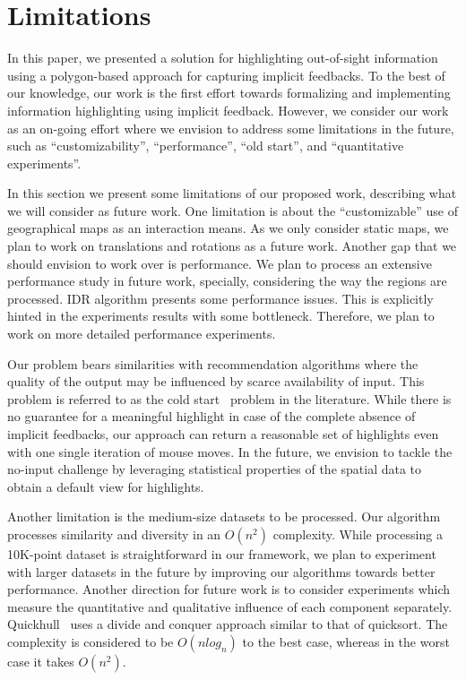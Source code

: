 \documentclass[sigconf,edbt]{acmart-edbt2019}
\begin{document}
\section{Limitations}
\label{sec:limitations}

 In this paper, we presented a solution for highlighting out-of-sight information using a polygon-based approach for capturing implicit feedbacks. To the best of our knowledge, our work is the first effort towards formalizing and implementing information highlighting using implicit feedback. However, we consider our work as an on-going effort where we envision to address some limitations in the future, such as ``customizability'', ``performance'', ``old start'', and ``quantitative experiments''.
 
 \vspace{2pt}
In this section we present some limitations of our proposed work, describing what we will consider as future work. One limitation is about the ``customizable'' use of geographical maps as an interaction means. As we only consider static maps, we plan to work on translations and rotations as a future work. Another gap that we should envision to work over is  performance. We plan to process an extensive performance study in future work, specially, considering the way the regions are processed. IDR algorithm presents some performance issues. This is explicitly hinted in the experiments results with some bottleneck. Therefore, we plan to work on more detailed performance experiments.

\vspace{2pt}
Our problem bears similarities with recommendation algorithms where the quality of the output may be influenced by scarce availability of input. This problem is referred to as the cold start~\cite{LeroyCB10} problem in the literature. While there is no guarantee for a meaningful highlight in case of the complete absence of implicit feedbacks, our approach can return a reasonable set of highlights even with one single iteration of mouse moves. In the future, we envision to tackle the no-input challenge by leveraging statistical properties of the spatial data to obtain a default view for highlights.

\vspace{2pt}
Another limitation is the medium-size datasets to be processed. Our algorithm processes similarity and diversity in an $O(n^2)$ complexity. While processing a 10K-point dataset is straightforward in our framework, we plan to experiment with larger datasets in the future by improving our algorithms towards better performance. Another direction for future work is to consider experiments which measure the quantitative and qualitative influence of each component separately.  Quickhull~\cite{Barber:1996} uses a divide and conquer approach similar to that of quicksort. The complexity is considered to be $O(n log_{n})$ to the best case, whereas in the worst case it takes $O(n^2)$.
\end{document}
